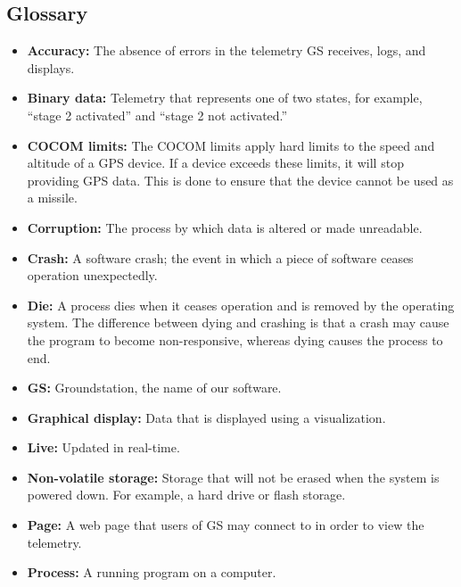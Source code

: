 \documentclass[10pt,draftclsnofoot,onecolumn]{IEEEtran}
\begin{document}
	\subsection{Glossary}
		\begin{itemize}
		\item \textbf{Accuracy:} The absence of errors in the telemetry GS receives, logs, and displays.
		\item \textbf{Binary data:} Telemetry that represents one of two states, for example, ``stage 2 activated'' and
		``stage 2 not activated.''		
		\item \textbf{COCOM limits:} The \ac{COCOM} limits apply hard limits to the speed and altitude of a GPS device.
		If a device exceeds these limits, it will stop providing GPS data.
		This is done to ensure that the device cannot be used as a missile.		
		\item \textbf{Corruption:} The process by which data is altered or made unreadable.
		\item \textbf{Crash:} A software crash; the event in which a piece of software ceases operation unexpectedly.
		\item \textbf{Die:} A process dies when it ceases operation and is removed by the operating system.
		The difference between dying and crashing is that a crash may cause the program to become non-responsive,
		whereas dying causes the process to end.
		\item \textbf{GS:} Groundstation, the name of our software.
		\item \textbf{Graphical display:} Data that is displayed using a visualization.
		\item \textbf{Live:} Updated in real-time.
		\item \textbf{Non-volatile storage:} Storage that will not be erased when the system is powered down.
		For example, a hard drive or flash storage.
		\item \textbf{Page:} A web page that users of GS may connect to in order to view the telemetry.
		\item \textbf{Process:} A running program on a computer.

\end{itemize}
\end{document}
